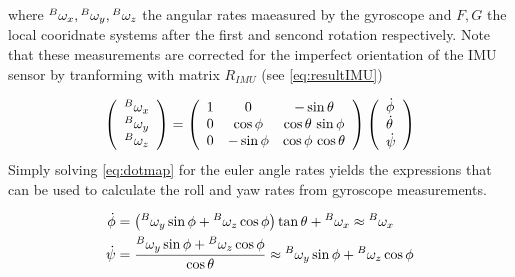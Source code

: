    where \ensuremath{\prescript{B}{}{\omega_{x}},\prescript{B}{}{\omega_{y}},\prescript{B}{}{\omega_{z}}} the angular rates maeasured by the gyroscope and \ensuremath{F,G} the local cooridnate systems after the first and sencond rotation respectively. Note that these measurements are corrected for the imperfect orientation of the IMU sensor by tranforming with matrix \ensuremath{R_{\mathit{IMU}}} (see \cref{eq:resultIMU})

    \begin{equation}
    \left(\begin{array}{c}{\prescript{B}{}{\omega_{x}}} \\ {\prescript{B}{}{\omega_{y}}} \\ {\prescript{B}{}{\omega_{z}}}\end{array}\right)=\left(\begin{array}{ccc} 1 & 0 & -\sin\theta \\ 0 & \cos\phi & \cos\theta \,\sin\phi \\ 0 & -\sin\phi & \cos\phi\,\cos\theta \end{array}\right)\left(\begin{array}{l}{\dot{\phi}} \\ {\dot{\theta}} \\ {\dot{\psi}}\end{array}\right)
        \label{eq:dotmap}
    \end{equation}
    Simply solving \cref{eq:dotmap} for the euler angle rates yields the expressions that can be used to calculate the roll and yaw rates from gyroscope measurements. 

\begin{align}
    \dot{\phi} &=\left(\prescript{B}{}{\omega_{y}} \sin \phi+\prescript{B}{}{\omega_{z}} \cos \phi\right) \tan \theta+\prescript{B}{}{\omega_{x}} \approx \prescript{B}{}{\omega_{x}}
    \label{eq:appb1}
    \\
    \dot{\psi} &=\frac{\prescript{B}{}{\omega_{y}} \sin \phi+\prescript{B}{}{\omega_{z}} \cos \phi}{\cos \theta} \approx \prescript{B}{}{\omega_{y}} \sin \phi+\prescript{B}{}{\omega_{z}} \cos \phi
    \label{eq:appb2}
\end{align}

